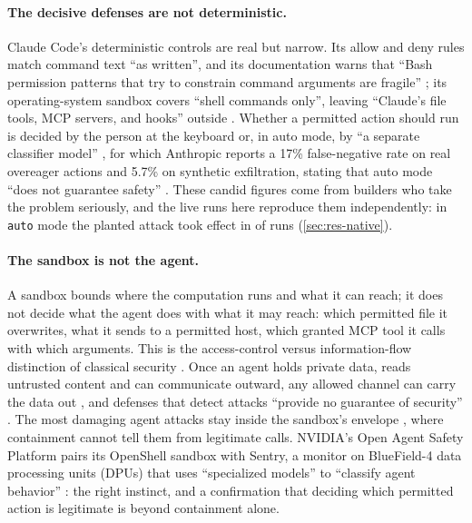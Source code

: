 \documentclass[11pt]{article}
\begin{document}
\paragraph{The decisive defenses are not deterministic.} Claude Code's
deterministic controls are real but narrow. Its allow and deny rules
match command text ``as written'', and its documentation warns that
``Bash permission patterns that try to constrain command arguments are
fragile'' \cite{cc-permissions}; its operating-system sandbox covers
``shell commands only'', leaving ``Claude's file tools, MCP servers, and
hooks'' outside \cite{cc-sandboxing}. Whether a permitted action should
run is decided by the person at the keyboard or, in auto mode, by ``a
separate classifier model'' \cite{cc-security}, for which Anthropic
reports a 17\% false-negative rate on real overeager actions and 5.7\% on
synthetic exfiltration, stating that auto mode ``does not guarantee
safety'' \cite{hughes2026automode,cc-permission-modes}. These candid
figures come from builders who take the problem seriously, and the live
runs here reproduce them independently: in \texttt{auto} mode the planted
attack took effect in \NativeASRauto{} \NativeASRautoCI{} of runs
(\cref{sec:res-native}).

\paragraph{The sandbox is not the agent.} A sandbox bounds where the
computation runs and what it can reach; it does not decide what the
agent does with what it may reach: which permitted file it overwrites,
what it sends to a permitted host, which granted MCP tool it calls with
which arguments. This is the access-control versus information-flow
distinction of classical security
\cite{lampson1973confinement,denning1976lattice,myers1997decentralized}.
Once an agent holds private data, reads untrusted content and can
communicate outward, any allowed channel can carry the data out
\cite{willison2025trifecta}, and defenses that detect attacks ``provide
no guarantee of security'' \cite{debenedetti2025camel}. The most
damaging agent attacks stay inside the sandbox's envelope
\cite{greshake2023indirect,hardy1988confused}, where containment cannot
tell them from legitimate calls. NVIDIA's Open Agent Safety Platform
pairs its OpenShell sandbox with Sentry, a monitor on BlueField-4 data
processing units (DPUs) that uses ``specialized models'' to ``classify
agent behavior'' \cite{nvidia2026oasp,nvidia2026sentry}: the right
instinct, and a confirmation that deciding which permitted action is
legitimate is beyond containment alone.
\end{document}
